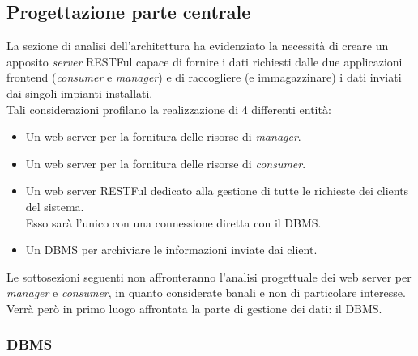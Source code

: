 \documentclass[12pt]{article}
\begin{document}
\subsection{Progettazione parte centrale}
La sezione di analisi dell'architettura ha evidenziato la necessità di creare un apposito \textit{server} RESTFul capace di fornire i dati richiesti dalle due applicazioni frontend (\textit{consumer} e \textit{manager}) e di raccogliere (e immagazzinare) i dati inviati dai singoli impianti installati.\\
Tali considerazioni profilano la realizzazione di 4 differenti entità:
\begin{itemize}
	\item Un web server per la fornitura delle risorse di \textit{manager}.
	\item Un web server per la fornitura delle risorse di \textit{consumer}.
	\item Un web server RESTFul dedicato alla gestione di tutte le richieste dei clients del sistema.\\Esso sarà l'unico con una connessione diretta con il DBMS.
	\item Un DBMS per archiviare le informazioni inviate dai client.
\end{itemize}
Le sottosezioni seguenti non affronteranno l'analisi progettuale dei web server per \textit{manager} e \textit{consumer}, in quanto considerate banali e non di particolare interesse.\\ 
Verrà però in primo luogo affrontata la parte di gestione dei dati: il DBMS.
\subsubsection{DBMS}
\end{document}
